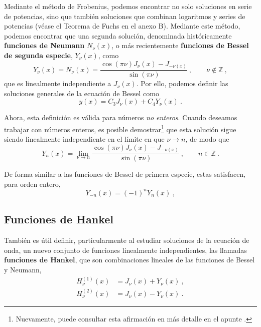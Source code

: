 Mediante el método de Frobenius, podemos encontrar no solo soluciones en serie de potencias, sino que también soluciones que combinan logaritmos y series de potencias (véase el Teorema de Fuchs en el anexo B). Mediante este método, podemos encontrar que una segunda solución, denominada históricamente \textbf{funciones de Neumann} $N_\nu(x)$, o más recientemente \textbf{funciones de Bessel de segunda especie}, $Y_\nu(x)$, como
\begin{equation}
    Y_\nu(x) = N_\nu(x) = \frac{\cos(\pi \nu) J_\nu(x) - J_{-\nu(x)}}{\sin(\pi \nu)} \ , \qquad \nu \notin \mathbb{Z} \ ,
\end{equation}
que es linealmente independiente a $J_\nu(x)$. Por ello, podemos definir las soluciones generales de la ecuación de Bessel como
\begin{equation}
    y(x) = C_3 J_\nu(x) + C_4 Y_\nu(x) \ .
\end{equation}

Ahora, esta definición es válida para números \emph{no enteros}. Cuando deseamos trabajar con números enteros, es posible demostrar\footnote{Nuevamente, puede consultar esta afirmación en más detalle en el apunte \cite{Rubilar}.} que esta solución sigue siendo linealmente independiente en el límite en que $\nu \to n$, de modo que
\begin{equation}
    Y_n(x) = \lim_{\nu \to n} \frac{\cos(\pi \nu) J_\nu(x) - J_{-\nu(x)}}{\sin(\pi \nu)} \ , \qquad n \in \mathbb{Z} \ .
\end{equation}

De forma similar a las funciones de Bessel de primera especie, estas satisfacen, para orden entero, 
\begin{equation}
    Y_{-n}(x) = (-1)^n Y_n(x) \ ,
\end{equation}

\subsection{Funciones de Hankel}

También es útil definir, particularmente al estudiar soluciones de la ecuación de onda,  un nuevo conjunto de funciones linealmente independientes, las llamadas \textbf{funciones de Hankel}, que son combinaciones lineales de las funciones de Bessel y Neumann,
\begin{align}
    H_\nu^{(1)}(x) & = J_\nu(x) + Y_\nu(x) \ , \\
    H_\nu^{(2)}(x) & = J_\nu(x) - Y_\nu(x) \ .
\end{align}

